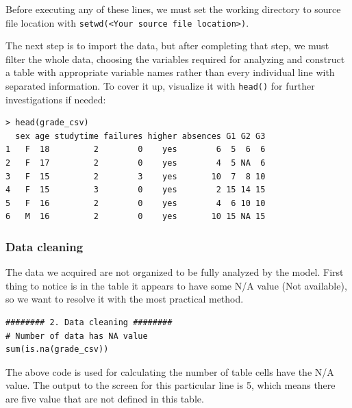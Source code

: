 \documentclass[a4paper]{article}
\numberwithin{equation}{section}
\begin{document}
Before executing any of these lines, we must set the working directory to source file location with \texttt{setwd(<Your source file location>)}.

The next step is to import the data, but after completing that step, we must filter the whole data, choosing the variables required for analyzing and construct a table with appropriate variable names rather than every individual line with separated information. To cover it up, visualize it with \texttt{head()} for further investigations if needed:

\begin{mdframed}[leftline=false,rightline=false,backgroundcolor=magenta!10,nobreak=true]
  \begin{verbatim}
> head(grade_csv)
  sex age studytime failures higher absences G1 G2 G3
1   F  18         2        0    yes        6  5  6  6
2   F  17         2        0    yes        4  5 NA  6
3   F  15         2        3    yes       10  7  8 10
4   F  15         3        0    yes        2 15 14 15
5   F  16         2        0    yes        4  6 10 10
6   M  16         2        0    yes       10 15 NA 15
  \end{verbatim}
\end{mdframed}

\newpage

\subsubsection{Data cleaning}
The data we acquired are not organized to be fully analyzed by the model. First thing to notice is in the table it appears to have some N/A value (Not available), so we want to resolve it with the most practical method.

\begin{mdframed}[leftline=false,rightline=false,backgroundcolor=magenta!10,nobreak=true]
  \begin{verbatim}
######## 2. Data cleaning ########
# Number of data has NA value
sum(is.na(grade_csv))
  \end{verbatim}
\end{mdframed}

The above code is used for calculating the number of table cells have the N/A value. The output to the screen for this particular line is 5, which means there are five value that are not defined in this table.
\end{document}
